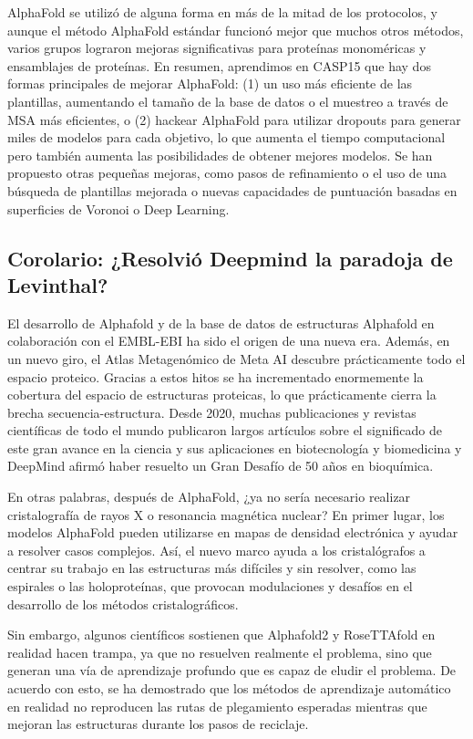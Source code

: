 AlphaFold se utilizó de alguna forma en más de la mitad de los protocolos, y aunque el método AlphaFold estándar funcionó mejor que muchos otros métodos, varios grupos lograron mejoras significativas para proteínas monoméricas y ensamblajes de proteínas. En resumen, aprendimos en CASP15 que hay dos formas principales de mejorar AlphaFold: (1) un uso más eficiente de las plantillas, aumentando el tamaño de la base de datos o el muestreo a través de MSA más eficientes, o (2) hackear AlphaFold para utilizar dropouts para generar miles de modelos para cada objetivo, lo que aumenta el tiempo computacional pero también aumenta las posibilidades de obtener mejores modelos. Se han propuesto otras pequeñas mejoras, como pasos de refinamiento o el uso de una búsqueda de plantillas mejorada o nuevas capacidades de puntuación basadas en superficies de Voronoi o Deep Learning.

\subsection{Corolario: ¿Resolvió Deepmind la paradoja de Levinthal?}
El desarrollo de Alphafold y de la base de datos de estructuras Alphafold en colaboración con el EMBL-EBI ha sido el origen de una nueva era. Además, en un nuevo giro, el Atlas Metagenómico de Meta AI descubre prácticamente todo el espacio proteico. Gracias a estos hitos se ha incrementado enormemente la cobertura del espacio de estructuras proteicas, lo que prácticamente cierra la brecha secuencia-estructura. Desde 2020, muchas publicaciones y revistas científicas de todo el mundo publicaron largos artículos sobre el significado de este gran avance en la ciencia y sus aplicaciones en biotecnología y biomedicina y DeepMind afirmó haber resuelto un Gran Desafío de 50 años en bioquímica.

En otras palabras, después de AlphaFold, ¿ya no sería necesario realizar cristalografía de rayos X o resonancia magnética nuclear? En primer lugar, los modelos AlphaFold pueden utilizarse en mapas de densidad electrónica y ayudar a resolver casos complejos. Así, el nuevo marco ayuda a los cristalógrafos a centrar su trabajo en las estructuras más difíciles y sin resolver, como las espirales o las holoproteínas, que provocan modulaciones y desafíos en el desarrollo de los métodos cristalográficos.

Sin embargo, algunos científicos sostienen que Alphafold2 y RoseTTAfold en realidad hacen trampa, ya que no resuelven realmente el problema, sino que generan una vía de aprendizaje profundo que es capaz de eludir el problema. De acuerdo con esto, se ha demostrado que los métodos de aprendizaje automático en realidad no reproducen las rutas de plegamiento esperadas mientras que mejoran las estructuras durante los pasos de reciclaje.

